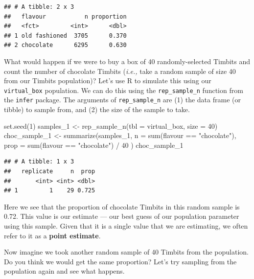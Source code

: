 \documentclass[
]{krantz}
\makeatletter
\newenvironment{Shaded}{\begin{snugshade}}{\end{snugshade}}
\newcommand{\AttributeTok}[1]{\textcolor[rgb]{0.61,0.61,0.61}{#1}}
\newcommand{\DecValTok}[1]{\textcolor[rgb]{0.06,0.06,0.06}{#1}}
\newcommand{\FunctionTok}[1]{\textcolor[rgb]{0,0,0}{#1}}
\newcommand{\NormalTok}[1]{#1}
\newcommand{\OtherTok}[1]{\textcolor[rgb]{0.37,0.37,0.37}{#1}}
\newcommand{\SpecialCharTok}[1]{\textcolor[rgb]{0,0,0}{#1}}
\newcommand{\StringTok}[1]{\textcolor[rgb]{0.5,0.5,0.5}{#1}}
\newenvironment{kframe}{%
\medskip{}
\setlength{\fboxsep}{.8em}
 \def\at@end@of@kframe{}%
 \ifinner\ifhmode%
  \def\at@end@of@kframe{\end{minipage}}%
  \begin{minipage}{\columnwidth}%
 \fi\fi%
 \def\FrameCommand##1{\hskip\@totalleftmargin \hskip-\fboxsep
 \colorbox{shadecolor}{##1}\hskip-\fboxsep
     \hskip-\linewidth \hskip-\@totalleftmargin \hskip\columnwidth}%
 \MakeFramed {\advance\hsize-\width
   \@totalleftmargin\z@ \linewidth\hsize
   \@setminipage}}%
 {\par\unskip\endMakeFramed%
 \at@end@of@kframe}
\renewenvironment{Shaded}{\begin{kframe}}{\end{kframe}}
\makeatother
\begin{document}
\begin{verbatim}
## # A tibble: 2 x 3
##   flavour           n proportion
##   <fct>         <int>      <dbl>
## 1 old fashioned  3705      0.370
## 2 chocolate      6295      0.630
\end{verbatim}

What would happen if we were to buy a box of 40 randomly-selected Timbits and count the number of chocolate Timbits (\emph{i.e.,} take a random sample of size 40 from our Timbits population)? Let's use R to simulate this using our \texttt{virtual\_box} population. We can do this using the \texttt{rep\_sample\_n} function from the \texttt{infer} package. The arguments
of \texttt{rep\_sample\_n} are (1) the data frame (or tibble) to sample from, and (2) the size of the sample to take.

\begin{Shaded}
\begin{Highlighting}[]
\FunctionTok{set.seed}\NormalTok{(}\DecValTok{1}\NormalTok{)}
\NormalTok{samples\_1 }\OtherTok{\textless{}{-}} \FunctionTok{rep\_sample\_n}\NormalTok{(}\AttributeTok{tbl =}\NormalTok{ virtual\_box, }\AttributeTok{size =} \DecValTok{40}\NormalTok{)}
\NormalTok{choc\_sample\_1 }\OtherTok{\textless{}{-}} \FunctionTok{summarize}\NormalTok{(samples\_1,}
  \AttributeTok{n =} \FunctionTok{sum}\NormalTok{(flavour }\SpecialCharTok{==} \StringTok{"chocolate"}\NormalTok{),}
  \AttributeTok{prop =} \FunctionTok{sum}\NormalTok{(flavour }\SpecialCharTok{==} \StringTok{"chocolate"}\NormalTok{) }\SpecialCharTok{/} \DecValTok{40}
\NormalTok{)}
\NormalTok{choc\_sample\_1}
\end{Highlighting}
\end{Shaded}

\begin{verbatim}
## # A tibble: 1 x 3
##   replicate     n  prop
##       <int> <int> <dbl>
## 1         1    29 0.725
\end{verbatim}

Here we see that the proportion of chocolate Timbits in this random sample is
0.72. This value is our estimate --- our best guess of our population parameter using this sample. Given that it is a single
value that we are estimating, we often refer to it as a \textbf{point estimate}.

Now imagine we took another random sample of 40 Timbits from the population. Do you
think we would get the same proportion? Let's try sampling from the population
again and see what happens.
\end{document}
